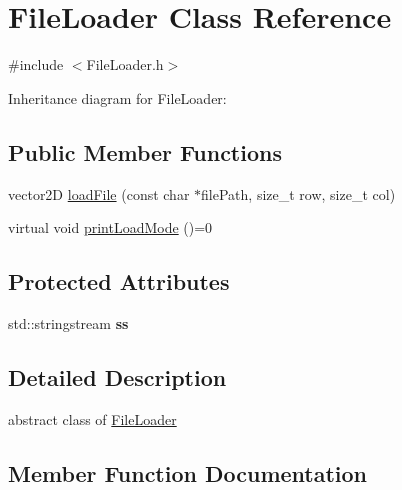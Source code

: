 \hypertarget{classFileLoader}{}\section{File\+Loader Class Reference}
\label{classFileLoader}


{\ttfamily \#include $<$File\+Loader.\+h$>$}



Inheritance diagram for File\+Loader\+:
\subsection*{Public Member Functions}
\begin{DoxyCompactItemize}
\item 
vector2D \hyperlink{classFileLoader_afb9c0aa014d80d6891ed3ecdf73b63f3}{load\+File} (const char $\ast$file\+Path, size\+\_\+t row, size\+\_\+t col)
\item 
virtual void \hyperlink{classFileLoader_ab8b81ea7fec2f851fa94473e79134b96}{print\+Load\+Mode} ()=0
\end{DoxyCompactItemize}
\subsection*{Protected Attributes}
\begin{DoxyCompactItemize}
\item 
std\+::stringstream {\bfseries ss}\hypertarget{classFileLoader_af64f8d222de4bec38f88ac56d5d70350}{}\label{classFileLoader_af64f8d222de4bec38f88ac56d5d70350}

\end{DoxyCompactItemize}


\subsection{Detailed Description}
abstract class of \hyperlink{classFileLoader}{File\+Loader} 

\subsection{Member Function Documentation}
